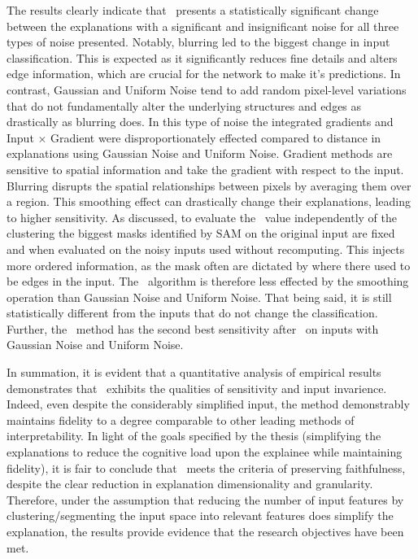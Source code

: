 The results clearly indicate that \CTC\ presents a statistically significant change between the explanations with a significant and insignificant noise for all three types of noise presented. Notably, blurring led to the biggest change in input classification. This is expected as it significantly reduces fine details and alters edge information, which are crucial for the network to make it's predictions. In contrast, Gaussian and Uniform Noise tend to add random pixel-level variations that do not fundamentally alter the underlying structures and edges as drastically as blurring does. In this type of noise the integrated gradients and Input $\times$ Gradient were disproportionately effected compared to distance in explanations using Gaussian Noise and Uniform Noise. Gradient methods are sensitive to spatial information and take the gradient with respect to the input. Blurring disrupts the spatial relationships between pixels by averaging them over a region. This smoothing effect can drastically change their explanations, leading to higher sensitivity. As discussed, to evaluate the \CTC\ value independently of the clustering the biggest masks identified by SAM on the original input are fixed and when evaluated on the noisy inputs used without recomputing. This injects more ordered information, as the mask often are dictated by where there used to be edges in the input. The \CTC\ algorithm is therefore less effected by the smoothing operation than Gaussian Noise and Uniform Noise. That being said, it is still statistically different from the inputs that do not change the classification. Further, the \CTC\ method has the second best sensitivity after \LRP\ on inputs with Gaussian Noise and Uniform Noise. 


In summation, it is evident that a quantitative analysis of empirical results demonstrates that \CTC\ exhibits the qualities of sensitivity and input invarience. Indeed, even despite the considerably simplified input, the method demonstrably maintains fidelity to a degree comparable to other leading methods of interpretability. In light of the goals specified by the thesis (simplifying the explanations to reduce the cognitive load upon the explainee while maintaining fidelity), it is fair to conclude that \CTC\ meets the criteria of preserving faithfulness, despite the clear reduction in explanation dimensionality and granularity. Therefore, under the assumption that reducing the number of input features by clustering/segmenting the input space into relevant features does simplify the explanation, the results provide evidence that the research objectives have been met.  


